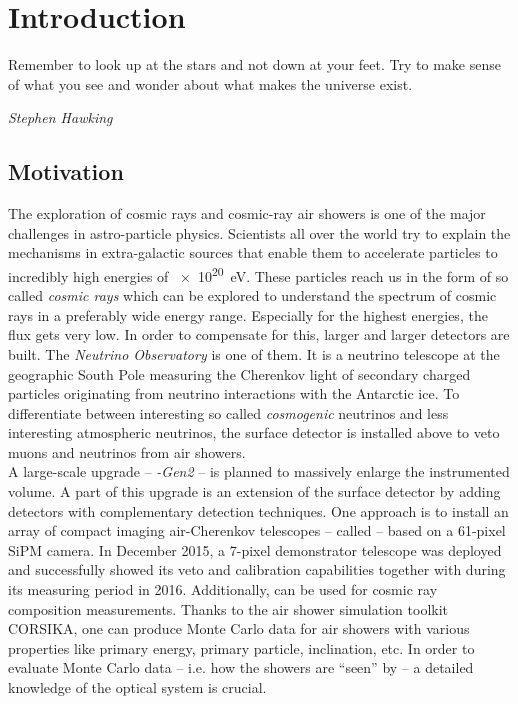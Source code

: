 \chapter{Introduction}

\epigraph{\frqq Remember to look up at the stars and not down at your feet. Try to make sense of what you see and wonder about what makes the universe exist.\flqq}{\textit{Stephen Hawking}}

\section{Motivation}

The exploration of cosmic rays and cosmic-ray air showers is one of the major challenges in astro-particle physics. Scientists all over the world try to explain the mechanisms in extra-galactic sources that enable them to accelerate particles to incredibly high energies of \SI{e20}{\electronvolt}. These particles reach us in the form of so called \textit{cosmic rays} which can be explored to understand the spectrum of cosmic rays in a preferably wide energy range. Especially for the highest energies, the flux gets very low. In order to compensate for this, larger and larger detectors are built. The \textit{\icecube Neutrino Observatory} is one of them. It is a neutrino telescope at the geographic South Pole measuring the Cherenkov light of secondary charged particles originating from neutrino interactions with the Antarctic ice. To differentiate between interesting so called \textit{cosmogenic} neutrinos and less interesting atmospheric neutrinos, the surface detector \icetop is installed above \icecube to veto muons and neutrinos from air showers.\\

A large-scale upgrade -- \textit{\icecube-Gen2} -- is planned to massively enlarge the instrumented volume. A part of this upgrade is an extension of the surface detector by adding detectors with complementary detection techniques. One approach is to install an array of compact imaging air-Cherenkov telescopes -- called \textit{\iceact} -- based on a 61-pixel SiPM camera. In December 2015, a 7-pixel demonstrator telescope was deployed and successfully showed its veto and calibration capabilities together with \icetop during its measuring period in 2016. Additionally, \iceact can be used for cosmic ray composition measurements. Thanks to the air shower simulation toolkit CORSIKA, one can produce Monte Carlo data for air showers with various properties like primary energy, primary particle, inclination, etc. In order to evaluate Monte Carlo data -- i.e. how the showers are \enquote{seen} by \iceact\xspace -- a detailed knowledge of the optical system is crucial.\\

